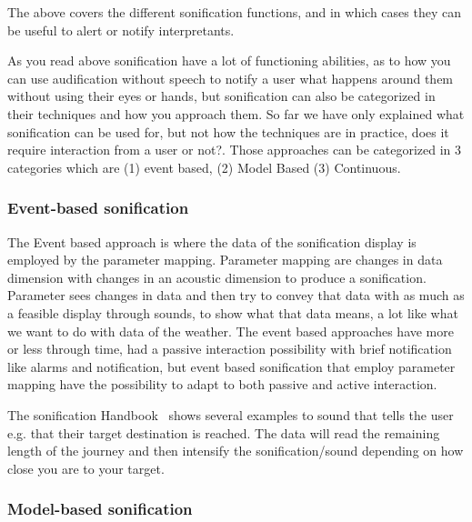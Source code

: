 The above covers the different sonification functions, and in which cases they can be useful to alert or notify interpretants.



As you read above sonification have a lot of functioning abilities, as to how you can use audification without speech to notify a user what happens around them without using their eyes or hands, but sonification can also be categorized in their techniques and how you approach them. 
So far we have only explained what sonification can be used for, but not how the techniques are in practice, does it require interaction from a user or not?. 
Those approaches can be categorized in 3 categories which are (1) event based, (2) Model Based (3) Continuous.


\subsubsection*{Event-based sonification} %
\label{ssub:event_based_sonification}

The Event based approach is where the data of the sonification display is employed by the parameter mapping. 
Parameter mapping are changes in data dimension with changes in an acoustic dimension to produce a sonification. 
Parameter sees changes in data and then try to convey that data with as much as a feasible display through sounds, to show what that data means, a lot like what we want to do with data of the weather. 
The event based approaches have more or less through time, had a passive interaction possibility with brief notification like alarms and notification, but event based sonification that employ parameter mapping have the possibility to adapt to both passive and active interaction.

The sonification Handbook~\cite[363]{Hermann2011} shows several examples to sound that tells the user e.g. that their target destination is reached.
The data will read the remaining length of the journey and then intensify the sonification/sound depending on how close you are to your target.



\subsubsection*{Model-based sonification} %
\label{ssub:analysis_model_based_sonification}

